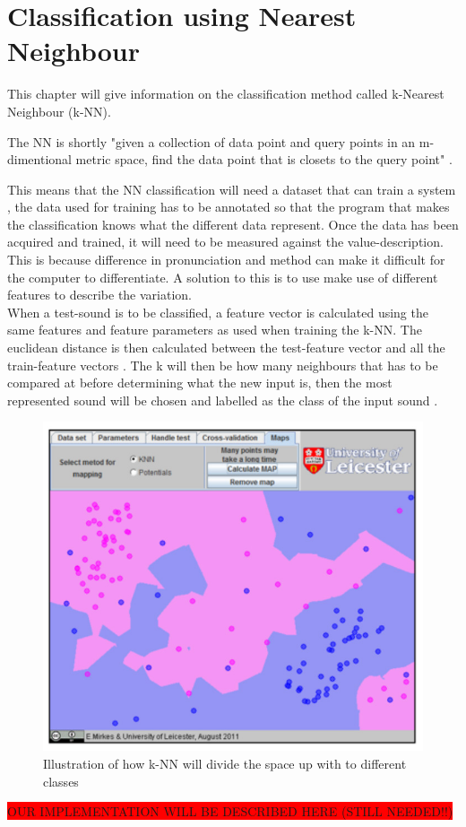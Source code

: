 \section{Classification using Nearest Neighbour}
This chapter will give information on the classification method called k-Nearest Neighbour (k-NN).

The NN is shortly "given a collection of data point and query points in an m-dimentional metric space, find the data point that is closets to the query point"
\citep{meaningfulNN}.

This means that the NN classification will need a dataset that can train a system \citep{Sinyor05}, the data used for training has to be annotated so that the program that makes the classification knows what the different data represent. 
Once the data has been acquired and trained, it will need to be measured against the value-description. This is because difference in pronunciation and method can make it difficult for the computer to differentiate. A solution to this is to use make use of different features to describe the variation. \\

When a test-sound is to be classified, a feature vector is calculated using the same features and feature parameters as used when training the k-NN.
The euclidean distance is then calculated between the test-feature vector and all the train-feature vectors \citep{NNHD}.
The k will then be how many neighbours that has to be compared at before determining what the new input is, then the most represented sound will be chosen and labelled as the class of the input sound \citep{introKNN}.

\begin{figure}[h]
	\begin{center}
		\includegraphics[scale = 0.5]{fig/KNNfig.jpg}
		\caption{Illustration of how k-NN will divide the space up with to different classes \citep{introKNN}}
		\label{KNN fig}
	\end{center}
\end{figure}

\colorbox{red}{OUR IMPLEMENTATION WILL BE DESCRIBED HERE (STILL NEEDED!!)}